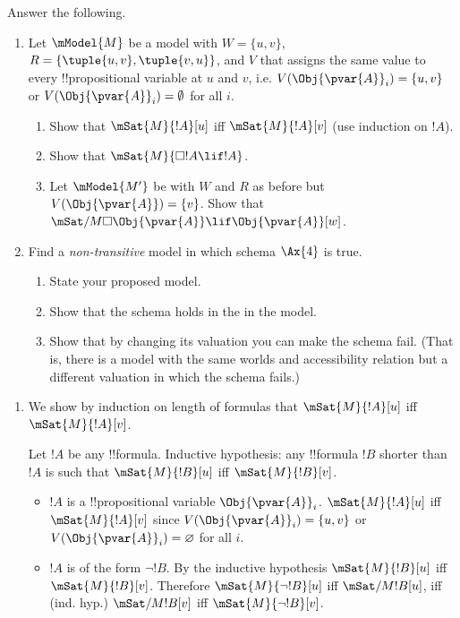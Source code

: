 \documentclass[../../../../include/open-logic-section]{subfiles}
\begin{document}
\begin{prob}
Answer the following.
\begin{enumerate}
	\item Let $\mModel{M}$ be a model with $W=\{u,v\}$,
	$R=\{\tuple{u,v},\tuple{v,u}\}$, and $V$ that assigns the same
	value to every !!{propositional variable} at $u$ 
	and $v$, i.e. $V(\Obj{\pvar{A}}_i) = \{u,v\}$ or $V(\Obj{\pvar{A}}_i) = \emptyset$ 
	for all $i$.
	\begin{enumerate}
		\item Show that $\mSat{M}{!A}[u]$ iff $\mSat{M}{!A}[v]$ (use
		induction on $!A$).
		\item Show that $\mSat{M}{\Box !A \lif !A}$.
		\item Let $\mModel{M'}$ be with $W$ and $R$ as before
		but $V(\Obj{\pvar{A}})=\{v\}$. Show that 
		$\mSat/{M}{\Box \Obj{\pvar{A}} \lif \Obj{\pvar{A}}}[w]$.
	\end{enumerate}
	\item Find a \emph{non-transitive} model in 
	which schema $\Ax{4}$ is true. 
	\begin{enumerate}
		\item State your proposed model. 
		\item Show that the schema holds in the
		in the model.
		\item Show that by changing its valuation you 
		can make the schema fail. (That is, there is a model with
		the same worlds and accessibility relation but a different
		valuation in which the schema fails.)
	\end{enumerate}
\end{enumerate}

	\begin{ans}
	\begin{enumerate}
		\item We show by induction on length of formulas that
		$\mSat{M}{!A}[u]$ iff $\mSat{M}{!A}[v]$.

		Let $!A$ be any !!{formula}. Inductive hypothesis: any
		!!{formula} $!B$ shorter than $!A$ is such that
		$\mSat{M}{!B}[u]$ iff $\mSat{M}{!B}[v]$.

		\begin{itemize}
			\item $!A$ is a !!{propositional variable} $\Obj{\pvar{A}}_i$.
			$\mSat{M}{!A}[u]$ iff $\mSat{M}{!A}[v]$ since
			$V(\Obj{\pvar{A}}_i) = \{u,v\}$ or $V(\Obj{\pvar{A}}_i) =
			\varnothing$ for all $i$.

			\item $!A$ is of the form $\lnot !B$. By the inductive 
			hypothesis $\mSat{M}{!B}[u]$ iff  $\mSat{M}{!B}[v]$. 
			Therefore $\mSat{M}{\lnot!B}[u]$ iff $\mSat/{M}{!B}[u]$, 
			iff (ind. hyp.) $\mSat/{M}{!B}[v]$ iff $\mSat{M}{\lnot!B}[v]$.


\end{itemize}
\end{enumerate}
\end{ans}
\end{prob}
\end{document}
